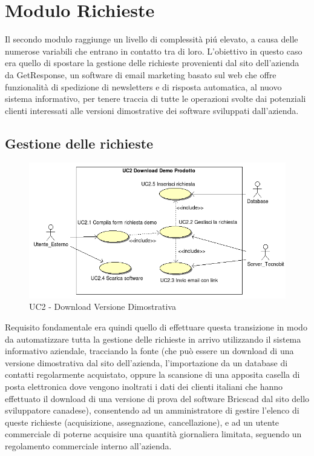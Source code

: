 \newpage
\section{Modulo Richieste}
Il secondo modulo raggiunge un livello di complessit\`a pi\'u elevato, a causa delle numerose variabili che entrano in contatto
tra di loro. L'obiettivo in questo caso era quello di spostare la gestione delle richieste provenienti dal sito dell'azienda da
GetResponse, un software di email marketing basato sul web che offre funzionalit\`a di spedizione di newsletters e di
risposta automatica, al nuovo sistema informativo, per tenere traccia di tutte le operazioni svolte dai potenziali clienti 
interessati alle versioni dimostrative dei software sviluppati dall'azienda. 
\subsection{Gestione delle richieste}
\begin{figure}[!ht]
\centering
 \includegraphics[scale=0.8]{./images/UC2_download.png}
\caption{UC2 - Download Versione Dimostrativa}
\end{figure}
Requisito fondamentale era quindi quello di effettuare questa transizione in modo da automatizzare tutta la gestione delle richieste
in arrivo utilizzando il sistema informativo aziendale, tracciando la fonte (che pu\`o essere un download di una versione dimostrativa
dal sito dell'azienda, l'importazione da un database di contatti regolarmente acquistato, oppure la scansione di una apposita casella
di posta elettronica dove vengono inoltrati i dati dei clienti italiani che hanno effettuato il download di una versione di prova del
software Bricscad dal sito dello sviluppatore canadese), consentendo ad un amministratore di gestire l'elenco di queste richieste
(acquisizione, assegnazione, cancellazione), e ad un utente commerciale di poterne acquisire una quantit\`a giornaliera limitata, 
seguendo un regolamento commerciale interno all'azienda.
